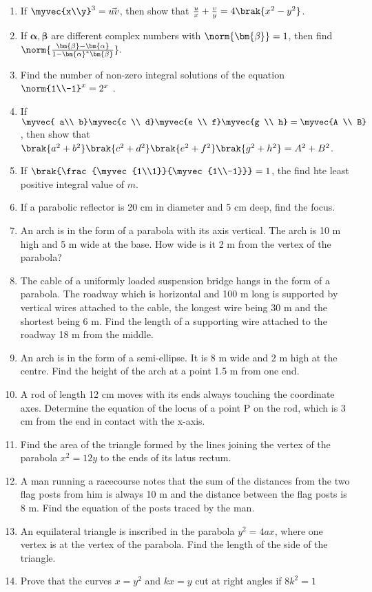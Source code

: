 \begin{enumerate}[label=\arabic*.,ref=\thesubsection.\theenumi]
%
\item If $\myvec{x\\y}^3 = \vec{u\\v}$, then show that $\frac{u}{x}+\frac{v}{y} = 4\brak{x^2-y^2}$.
\item If $\bm{\alpha}, \bm{\beta}$ are different complex numbers with $\norm{\bm{\beta}}=1$, then find $\norm{\frac{\bm{\beta}-\bm{\alpha}}{1-\bm{\alpha}^{*}\bm{\beta}}}.$
\item Find the number of non-zero integral solutions of the equation $\norm{1\\-1}^x = 2^x$ .
\item If $\myvec{ a\\ b}\myvec{c \\ d}\myvec{e \\ f}\myvec{g \\ h} = \myvec{A \\ B}$, then show that 
$\brak{a^2+b^2}\brak{c^2+d^2}\brak{e^2+f^2}\brak{g^2+h^2}=A^2+B^2$.
\item If $\brak{\frac{\myvec{1\\1}}{\myvec{1\\-1}}}=1$,  the find hte least positive integral value of $m$.
\item If a parabolic reflector is 20 cm in diameter and 5 cm deep, find the focus. 
\item An arch is in the form of a parabola with its axis vertical. The arch is 10 m high and 5 m wide at the base. How wide is it 2 m from the vertex of the parabola?
\item The cable of a uniformly loaded suspension bridge hangs in the form of a parabola. The roadway which is horizontal and 100 m long is supported by vertical wires attached to the cable, the longest wire being 30 m and the shortest being 6 m. Find the length of a supporting wire attached to the roadway 18 m from the middle.
\item An arch is in the form of a semi-ellipse. It is 8 m wide and 2 m high at the centre. Find the height of the arch at a point 1.5 m from one end.
\item A rod of length 12 cm moves with its ends always touching the coordinate axes. Determine the equation of the locus of a point P on the rod, which is 3 cm from the end in contact with the x-axis.
\item Find the area of the triangle formed by the lines joining the vertex of the parabola $x^2= 12y$ to the ends of its latus rectum.
\item A man running a racecourse notes that the sum of the distances from the two flag posts from him is always 10 m and the distance between the flag posts is 8 m. Find the equation of the posts traced by the man.
\item An equilateral triangle is inscribed in the parabola $y^2 = 4 ax$, where one vertex is at the vertex of the parabola. Find the length of the side of the triangle.
%
%
 \item Prove that the curves $x = y^2$ and $kx=y$ cut at right angles if $8k^2 = 1$


\end{enumerate}
